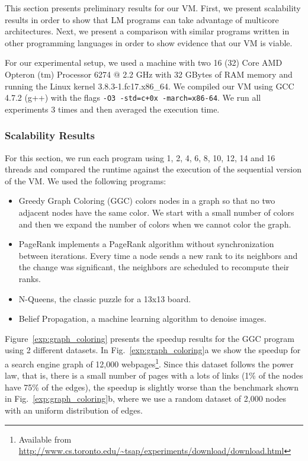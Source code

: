 This section presents preliminary results for our VM.
First, we present scalability results in order to show that LM programs can take advantage of multicore architectures.
Next, we present a comparison with similar programs written in other programming languages
in order to show evidence that our VM is viable.

For our experimental setup, we used a machine 
with two 16 (32) Core AMD Opteron
(tm) Processor 6274 $@$ 2.2 GHz with 32 GBytes of RAM memory and running the Linux
kernel 3.8.3-1.fc17.x86\_64.
     We compiled our VM using GCC 4.7.2 (g++) with the flags \texttt{-O3 -std=c+0x -march=x86-64}.
     We run all experiments 3 times and then averaged the execution time.
     
\subsubsection{Scalability Results}

For this section, we run each program using 1, 2, 4, 6, 8, 10, 12, 14 and 16 threads and compared the runtime against the execution of the sequential version of the VM. We used the following programs:

\newcommand{\figsize}[0]{6.5cm}
\captionsetup[sub]{              %
       font=scriptsize}

\begin{itemize}
   \item Greedy Graph Coloring (GGC) colors nodes in a graph so that no two adjacent nodes have the same color. We start with a small number of colors and then we expand the number of colors when we cannot color the graph.
   \item PageRank implements a PageRank algorithm without synchronization between iterations. Every time a node sends a new rank to its neighbors and the change was significant, the neighbors are scheduled to recompute their ranks.
   \item N-Queens, the classic puzzle for a 13x13 board.
   \item Belief Propagation, a machine learning algorithm to denoise images.
\end{itemize}

Figure~\ref{exp:graph_coloring} presents the speedup results for the GGC program using 2 different datasets. In Fig.~\ref{exp:graph_coloring}a we show the speedup for a search engine graph of 12,000 webpages\footnote{Available from \url{http://www.cs.toronto.edu/~tsap/experiments/download/download.html}}. Since this dataset follows the power law, that is, there is a small number of pages with a lots of links (1\% of the nodes have 75\% of the edges), the speedup is slightly worse than the benchmark shown in Fig.~\ref{exp:graph_coloring}b, where we use a random dataset of 2,000 nodes with an uniform distribution of edges.

